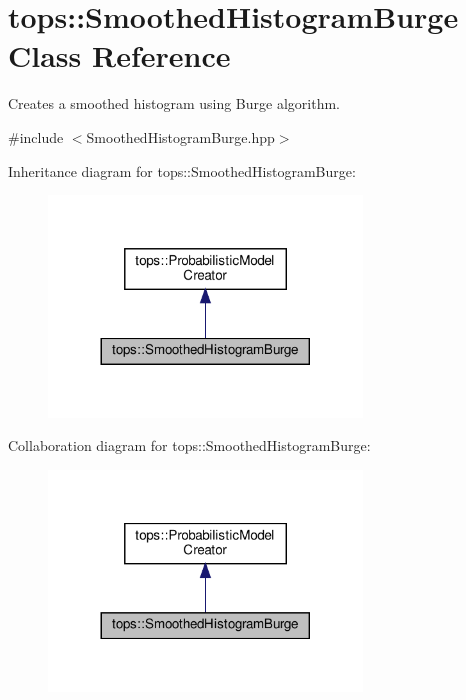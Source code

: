 \hypertarget{classtops_1_1SmoothedHistogramBurge}{}\section{tops\+:\+:Smoothed\+Histogram\+Burge Class Reference}
\label{classtops_1_1SmoothedHistogramBurge}


Creates a smoothed histogram using Burge algorithm.  




{\ttfamily \#include $<$Smoothed\+Histogram\+Burge.\+hpp$>$}



Inheritance diagram for tops\+:\+:Smoothed\+Histogram\+Burge\+:
\nopagebreak
\begin{figure}[H]
\begin{center}
\leavevmode
\includegraphics[width=236pt]{classtops_1_1SmoothedHistogramBurge__inherit__graph}
\end{center}
\end{figure}


Collaboration diagram for tops\+:\+:Smoothed\+Histogram\+Burge\+:
\nopagebreak
\begin{figure}[H]
\begin{center}
\leavevmode
\includegraphics[width=236pt]{classtops_1_1SmoothedHistogramBurge__coll__graph}
\end{center}
\end{figure}
